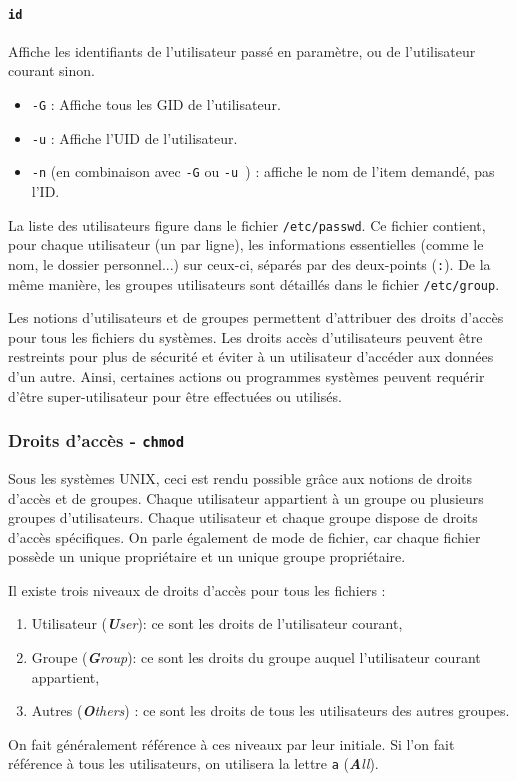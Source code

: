 \paragraph{\texttt{id}} 
Affiche les identifiants de l'utilisateur passé en paramètre, ou de l'utilisateur courant sinon.
\begin{itemize}
    \item \texttt{-G} : Affiche tous les GID de l'utilisateur.
    \item \texttt{-u} : Affiche l'UID de l'utilisateur.
    \item \texttt{-n} (en combinaison avec \texttt{-G} ou \texttt{-u }) : affiche le nom de l'item demandé, pas l'ID.
\end{itemize}\vspace{\baselineskip}
La liste des utilisateurs figure dans le fichier \texttt{/etc/passwd}. Ce fichier contient, pour chaque utilisateur (un par ligne), les informations essentielles (comme le nom, le dossier personnel...) sur ceux-ci, séparés par des deux-points (\texttt{:}). De la même manière, les groupes utilisateurs sont détaillés dans le fichier \texttt{/etc/group}.

Les notions d'utilisateurs et de groupes permettent d'attribuer des droits d'accès pour tous les fichiers du systèmes. Les droits accès d'utilisateurs peuvent être restreints pour plus de sécurité et éviter à un utilisateur d'accéder aux données d'un autre. Ainsi, certaines actions ou programmes systèmes peuvent requérir d'être super-utilisateur pour être effectuées ou utilisés.

\newpage
\subsubsection{Droits d'accès - \texttt{chmod}} \label{sec:chmod}
\vspace{-3mm}

Sous les systèmes UNIX, ceci est rendu possible grâce aux notions de droits d'accès et de groupes. Chaque utilisateur appartient à un groupe ou plusieurs groupes d'utilisateurs. Chaque utilisateur et chaque groupe dispose de droits d'accès spécifiques. On parle également de mode de fichier, car chaque fichier possède un unique propriétaire et un unique groupe propriétaire.

Il existe trois niveaux de droits d'accès pour tous les fichiers : 
\begin{enumerate}
    \item Utilisateur (\textit{\textbf{U}ser}): ce sont les droits de l'utilisateur courant,
    \item Groupe (\textit{\textbf{G}roup}): ce sont les droits du groupe auquel l'utilisateur courant appartient,
    \item Autres (\textit{\textbf{O}thers}) : ce sont les droits de tous les utilisateurs des autres groupes.
\end{enumerate}
On fait généralement référence à ces niveaux par leur initiale. Si l'on fait référence à tous les utilisateurs, on utilisera la lettre \texttt{a} (\textit{\textbf{A}ll}).

